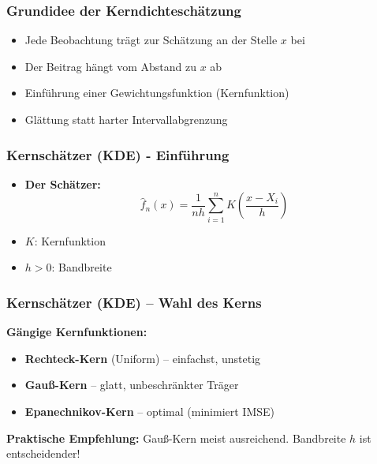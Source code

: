 \documentclass{beamer}
\begin{document}
	\begin{frame}
		\frametitle{Grundidee der Kerndichteschätzung}
		
		\begin{itemize}
			\item Jede Beobachtung trägt zur Schätzung an der Stelle $x$ bei
			\item Der Beitrag hängt vom Abstand zu $x$ ab
		\end{itemize}
		
		\vspace{0.5em}
		
		\begin{itemize}
			\item Einführung einer Gewichtungsfunktion (Kernfunktion)
			\item Glättung statt harter Intervallabgrenzung
		\end{itemize}
	\end{frame}
	
	\begin{frame}
		\frametitle{Kernschätzer (KDE) - Einführung}
		
		\begin{itemize}
			\item \textbf{Der Schätzer:}
			\begin{equation}
				\hat{f}_n(x) = \frac{1}{nh} \sum_{i=1}^{n} K\left(\frac{x - X_i}{h}\right)
			\end{equation}
		\end{itemize}
		
		\begin{itemize}
			\item $K$: Kernfunktion
			\item $h > 0$: Bandbreite
		\end{itemize}
	\end{frame}
	
	\begin{frame}
		\frametitle{Kernschätzer (KDE) – Wahl des Kerns}
		
		\textbf{Gängige Kernfunktionen:}
		\begin{itemize}
			\item \textbf{Rechteck-Kern} (Uniform) – einfachst, unstetig
			\item \textbf{Gauß-Kern} – glatt, unbeschränkter Träger
			\item \textbf{Epanechnikov-Kern} – optimal (minimiert IMSE)
		\end{itemize}
		
		\vspace{0.5em}
		
		\textbf{Praktische Empfehlung:} Gauß-Kern meist ausreichend. Bandbreite $h$ ist entscheidender!
	\end{frame}
	
\end{document}

